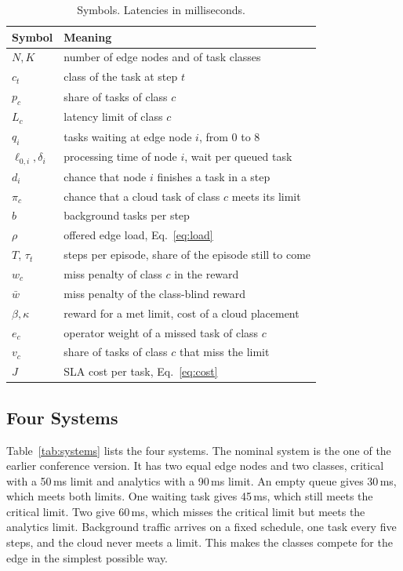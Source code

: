 \documentclass[journal]{IEEEtran}
\begin{document}
\begin{table}[t]
\caption{Symbols. Latencies in milliseconds.}
\label{tab:symbols}
\centering
\footnotesize
\setlength{\tabcolsep}{3pt}
\begin{tabular}{@{}l>{\raggedright\arraybackslash}p{6.2cm}@{}}
\toprule
Symbol & Meaning \\
\midrule
$N, K$ & number of edge nodes and of task classes \\
$c_t$ & class of the task at step $t$ \\
$p_c$ & share of tasks of class $c$ \\
$L_c$ & latency limit of class $c$ \\
$q_i$ & tasks waiting at edge node $i$, from 0 to 8 \\
$\ell_{0,i}, \delta_i$ & processing time of node $i$, wait per queued task \\
$d_i$ & chance that node $i$ finishes a task in a step \\
$\pi_c$ & chance that a cloud task of class $c$ meets its limit \\
$b$ & background tasks per step \\
$\rho$ & offered edge load, Eq.~\eqref{eq:load} \\
$T$, $\tau_t$ & steps per episode, share of the episode still to come \\
$w_c$ & miss penalty of class $c$ in the reward \\
$\bar w$ & miss penalty of the class-blind reward \\
$\beta, \kappa$ & reward for a met limit, cost of a cloud placement \\
$e_c$ & operator weight of a missed task of class $c$ \\
$v_c$ & share of tasks of class $c$ that miss the limit \\
$J$ & SLA cost per task, Eq.~\eqref{eq:cost} \\
\bottomrule
\end{tabular}
\end{table}

\subsection{Four Systems}
Table~\ref{tab:systems} lists the four systems. The nominal system is the one of the earlier conference version. It has two equal edge nodes and two classes, critical with a 50\,ms limit and analytics with a 90\,ms limit. An empty queue gives 30\,ms, which meets both limits. One waiting task gives 45\,ms, which still meets the critical limit. Two give 60\,ms, which misses the critical limit but meets the analytics limit. Background traffic arrives on a fixed schedule, one task every five steps, and the cloud never meets a limit. This makes the classes compete for the edge in the simplest possible way.
\end{document}
